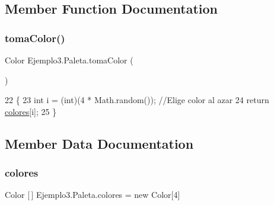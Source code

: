 \subsection{Member Function Documentation}
\mbox{\label{class_ejemplo3_1_1_paleta_aa20bc99fc1c973c324f038a8cb5012f8}} 
\subsubsection{\texorpdfstring{toma\+Color()}{tomaColor()}}
{\footnotesize\ttfamily Color Ejemplo3.\+Paleta.\+toma\+Color (\begin{DoxyParamCaption}{ }\end{DoxyParamCaption})\hspace{0.3cm}{\ttfamily [inline]}}


\begin{DoxyCode}
22     \{
23         \textcolor{keywordtype}{int} i = (int)(4 * Math.random());  \textcolor{comment}{//Elige color al azar}
24         \textcolor{keywordflow}{return} \mbox{\hyperlink{class_ejemplo3_1_1_paleta_a33e56a8007182e988e912a675af18fa5}{colores}}[i];
25     \}
\end{DoxyCode}


\subsection{Member Data Documentation}
\mbox{\label{class_ejemplo3_1_1_paleta_a33e56a8007182e988e912a675af18fa5}} 
\subsubsection{\texorpdfstring{colores}{colores}}
{\footnotesize\ttfamily Color \mbox{[}$\,$\mbox{]} Ejemplo3.\+Paleta.\+colores = new Color\mbox{[}4\mbox{]}\hspace{0.3cm}{\ttfamily [private]}}

